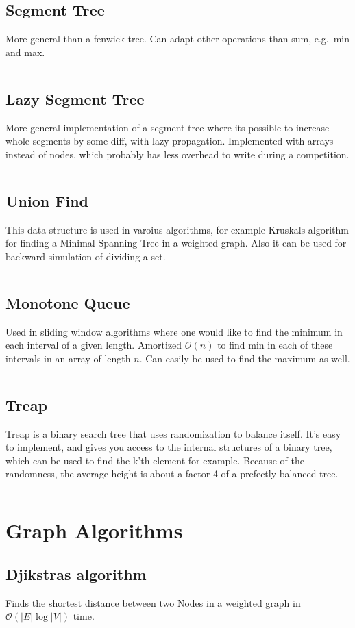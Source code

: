 \documentclass[8pt,a4paper,landscape,oneside]{amsart}
\newcommand{\codej}[1]{\inputminted[fontsize=\large,baselinestretch=1]{java}{code/#1}}
\newcommand{\bigO}{\mathcal{O}}
\begin{document}
\begin{multicols*}{2}
\begin{large}
    \subsection{Segment Tree}
        More general than a fenwick tree. Can adapt other operations than sum, e.g.\ min and max.
        \codej{DS/ST.java}
    \subsection{Lazy Segment Tree}
        More general implementation of a segment tree where its possible to increase whole segments by some diff, with lazy propagation. Implemented with arrays instead of nodes, which probably has less overhead to write during a competition.
        \codej{DS/LazySegmentTree.java}
    \subsection{Union Find}
        This data structure is used in varoius algorithms, for example Kruskals algorithm for finding a Minimal Spanning Tree in a weighted graph. Also it can be used for backward simulation of dividing a set.
        \codej{DS/UF.java}
    \subsection{Monotone Queue}
        Used in sliding window algorithms where one would like to find the minimum in each interval of a given length. Amortized $\bigO(n)$ to find min in each of these intervals in an array of length $n$. Can easily be used to find the maximum as well.
        \codej{DS/MinMonQue.java}
    \subsection{Treap}
        Treap is a binary search tree that uses randomization to balance itself. 
        It's easy to implement, and gives you access to the internal structures of a binary tree, 
        which can be used to find the k'th element for example. Because of the randomness, the average height is about a factor 4 of a prefectly balanced tree.
        \codej{DS/Treap.java}
\section{Graph Algorithms}
    \subsection{Djikstras algorithm}
        Finds the shortest distance between two Nodes in a weighted graph in $\bigO (|E| \log{|V|})$ time.
        \codej{Graphs/Djikstra.java}

\end{large}
\end{multicols*}
\end{document}
